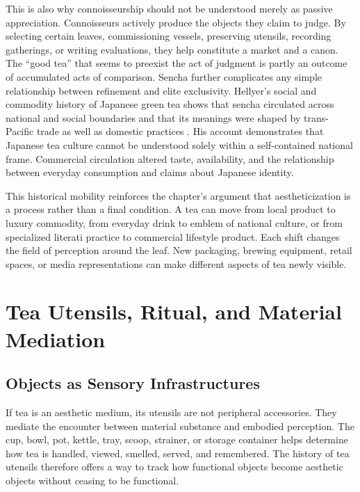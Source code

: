 \documentclass[numbers]{IntechOpen-Book}
\begin{document}
This is also why connoisseurship should not be understood merely as passive appreciation. Connoisseurs actively produce the objects they claim to judge. By selecting certain leaves, commissioning vessels, preserving utensils, recording gatherings, or writing evaluations, they help constitute a market and a canon. The ``good tea'' that seems to preexist the act of judgment is partly an outcome of accumulated acts of comparison.
Sencha further complicates any simple relationship between refinement and elite exclusivity. Hellyer's social and commodity history of Japanese green tea shows that sencha circulated across national and social boundaries and that its meanings were shaped by trans-Pacific trade as well as domestic practices \cite{hellyer}. His account demonstrates that Japanese tea culture cannot be understood solely within a self-contained national frame. Commercial circulation altered taste, availability, and the relationship between everyday consumption and claims about Japanese identity.

This historical mobility reinforces the chapter's argument that aestheticization is a process rather than a final condition. A tea can move from local product to luxury commodity, from everyday drink to emblem of national culture, or from specialized literati practice to commercial lifestyle product. Each shift changes the field of perception around the leaf. New packaging, brewing equipment, retail spaces, or media representations can make different aspects of tea newly visible.

\section{Tea Utensils, Ritual, and Material Mediation}

\subsection{Objects as Sensory Infrastructures}
If tea is an aesthetic medium, its utensils are not peripheral accessories. They mediate the encounter between material substance and embodied perception. The cup, bowl, pot, kettle, tray, scoop, strainer, or storage container helps determine how tea is handled, viewed, smelled, served, and remembered. The history of tea utensils therefore offers a way to track how functional objects become aesthetic objects without ceasing to be functional.
\end{document}
